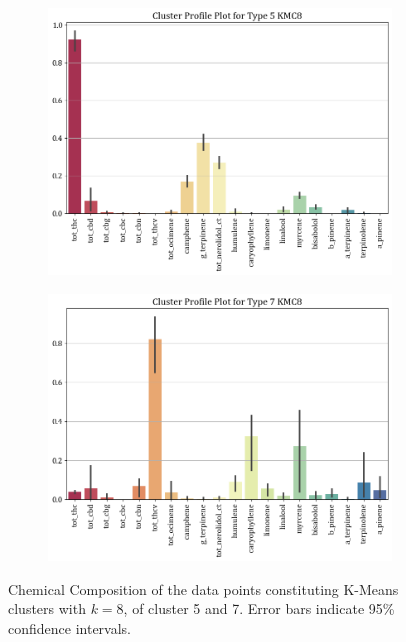 \documentclass[11pt,a4paper]{article}
\begin{document}
\begin{figure}[H]
     \centering
     \begin{subfigure}[b]{0.475\textwidth}
         \centering
         \includegraphics[width=\textwidth]{images/km8_5.png}
         \label{fig:km8_5}
     \end{subfigure}
     \hfill
     \begin{subfigure}[b]{0.475\textwidth}
         \centering
         \includegraphics[width=\textwidth]{images/km8_7.png}
         \label{fig:km8_7}
     \end{subfigure}
    \caption{Chemical Composition of the data points constituting K-Means clusters with $k=8$, of cluster 5 and 7. Error bars indicate 95\% confidence intervals.}
    \label{fig:km8}
\end{figure}
\end{document}
